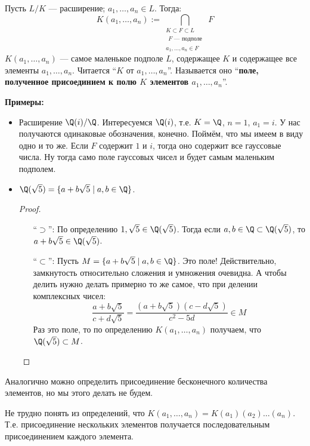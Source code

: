 \begin{conj}
    Пусть $L / K$ --- расширение; $a_1, \dots, a_n \in L$.
    Тогда:
    $$ K(a_1, \dots, a_n) := \bigcap_{\substack{K \subset F \subset L \\ \substack{F \text{ --- подполе}} \\ a_1, \dots, a_n \in F}} F $$
    $K(a_1, \dots, a_n)$ --- самое маленькое подполе $L$, содержащее $K$ и содержащее все элементы $a_1, \dots, a_n$. Читается ``$K$ от $a_1, \dots, a_n$''. Называется оно ``\textbf{поле, полученное присоединием к полю $K$ элементов $a_1, \dots, a_n$}''.
\end{conj}
\textbf{Примеры:} 
\begin{itemize}
    \item Расширение $\Q(i) / \Q$. Интересуемся $\Q(i)$, т.е. $K = \Q$, $n = 1$, $a_1 = i$. У нас получаются одинаковые обозначения, конечно. Поймём, что мы имеем в виду одно и то же. Если $F$ содержит $1$ и $i$, тогда оно содержит все гауссовые числа. Ну тогда само поле гауссовых чисел и будет самым маленьким подполем.

    \item $\Q(\sqrt{5}) = \{ a + b \sqrt{5} \mid a, b \in \Q \}$.
    \begin{proof} $ $
        \begin{itemize}
            \item[``$\supset$'':] По определению $1, \sqrt{5} \in \Q(\sqrt{5})$. Тогда если $a, b \in \Q \subset \Q(\sqrt{5})$, то $a + b \sqrt{5} \in \Q(\sqrt{5})$.
             
            \item[``$\subset$'':] Пусть $M = \{ a + b \sqrt{5} \mid a, b \in \Q \}$. Это поле! Действительно, замкнутость относительно сложения и умножения очевидна. А чтобы делить нужно делать примерно то же самое, что при делении комплексных чисел:
            $$ \frac{a + b\sqrt{5}}{c + d\sqrt{5}} = \frac{(a + b\sqrt{5})(c - d\sqrt{5})}{c^2 - 5d} \in M $$
            Раз это поле, то по определению $K(a_1, \dots, a_n)$ получаем, что $\Q(\sqrt{5}) \subset M$.
        \end{itemize}
    \end{proof}
\end{itemize}

\notice Аналогично можно определить присоединение бесконечного количества элементов, но мы этого делать не будем.

\notice Не трудно понять из определений, что $K(a_1, \dots, a_n) = K(a_1)(a_2)\dots(a_n)$. Т.е. присоединение нескольких элементов получается последовательным присоединением каждого элемента.

